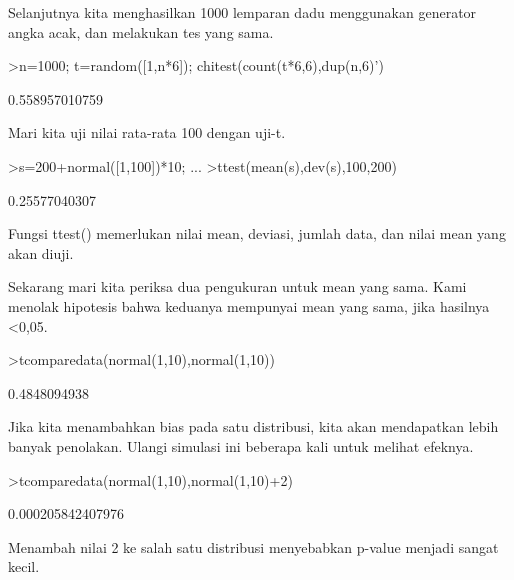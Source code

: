 \documentclass[a4paper,10pt]{article}
\begin{document}
\begin{eulernotebook}
\begin{eulercomment}
\begin{eulercomment}
\begin{eulercomment}
Selanjutnya kita menghasilkan 1000 lemparan dadu menggunakan generator
angka acak, dan melakukan tes yang sama.
\end{eulercomment}
\begin{eulerprompt}
>n=1000; t=random([1,n*6]); chitest(count(t*6,6),dup(n,6)')
\end{eulerprompt}
\begin{euleroutput}
  0.558957010759
\end{euleroutput}
\begin{eulercomment}
Mari kita uji nilai rata-rata 100 dengan uji-t.
\end{eulercomment}
\begin{eulerprompt}
>s=200+normal([1,100])*10; ...
>ttest(mean(s),dev(s),100,200)
\end{eulerprompt}
\begin{euleroutput}
  0.25577040307
\end{euleroutput}
\begin{eulercomment}
Fungsi ttest() memerlukan nilai mean, deviasi, jumlah data, dan nilai
mean yang akan diuji.

Sekarang mari kita periksa dua pengukuran untuk mean yang sama. Kami
menolak hipotesis bahwa keduanya mempunyai mean yang sama, jika
hasilnya \textless{}0,05.
\end{eulercomment}
\begin{eulerprompt}
>tcomparedata(normal(1,10),normal(1,10))
\end{eulerprompt}
\begin{euleroutput}
  0.4848094938
\end{euleroutput}
\begin{eulercomment}
Jika kita menambahkan bias pada satu distribusi, kita akan mendapatkan
lebih banyak penolakan. Ulangi simulasi ini beberapa kali untuk
melihat efeknya.
\end{eulercomment}
\begin{eulerprompt}
>tcomparedata(normal(1,10),normal(1,10)+2)
\end{eulerprompt}
\begin{euleroutput}
  0.000205842407976
\end{euleroutput}
\begin{eulercomment}
Menambah nilai 2 ke salah satu distribusi menyebabkan p-value menjadi
sangat kecil.


\end{eulercomment}
\end{eulercomment}
\end{eulercomment}
\end{eulernotebook}
\end{document}
